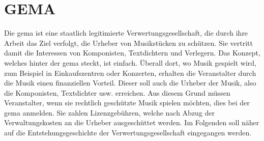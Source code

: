 \chapter{GEMA}
Die \gls{gema} ist eine staatlich legitimierte Verwertungsgesellschaft, die durch ihre Arbeit das Ziel verfolgt, die Urheber von Musikstücken zu schützen. Sie vertritt damit die Interessen von Komponisten, Textdichtern und Verlegern. Das Konzept, welches hinter der \gls{gema} steckt, ist einfach. Überall dort, wo Musik gespielt wird, zum Beispiel in Einkaufszentren oder Konzerten, erhalten die Veranstalter durch die Musik einen finanziellen Vorteil. Dieser soll auch die Urheber der Musik, also die Komponisten, Textdichter usw. erreichen. Aus diesem Grund müssen Veranstalter, wenn sie rechtlich geschützte Musik spielen möchten, dies bei der \gls{gema} anmelden. Sie zahlen Lizenzgebühren, welche nach Abzug der Verwaltungskosten an die Urheber ausgeschüttet werden.
\newline
Im Folgenden soll näher auf die Entstehungsgeschichte der Verwertungsgesellschaft eingegangen werden.
